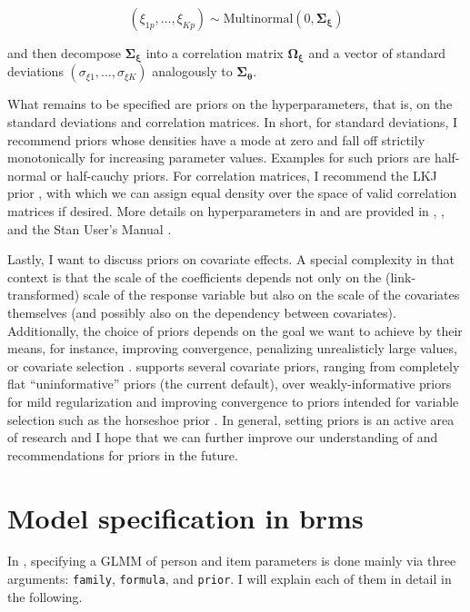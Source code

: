 \documentclass[jss]{jss}
\begin{document}
\[
(\xi_{1p}, \ldots, \xi_{Kp}) \sim \text{Multinormal}(0, \mathbf{\Sigma_\xi})
\]

and then decompose \(\mathbf{\Sigma_\xi}\) into a correlation matrix
\(\mathbf{\Omega_\xi}\) and a vector of standard deviations
\((\sigma_{\xi 1}, \ldots, \sigma_{\xi K})\) analogously to
\(\mathbf{\Sigma_\theta}\).

What remains to be specified are priors on the hyperparameters, that is,
on the standard deviations and correlation matrices. In short, for
standard deviations, I recommend priors whose densities have a mode at
zero and fall off strictily monotonically for increasing parameter
values. Examples for such priors are half-normal or half-cauchy priors.
For correlation matrices, I recommend the LKJ prior
\citep{lewandowski2009}, with which we can assign equal density over the
space of valid correlation matrices if desired. More details on
hyperparameters in  and  are provided in
\citet{brms1}, \citet{brms2}, and the Stan User's Manual
\citep{stanM2019}.

Lastly, I want to discuss priors on covariate effects. A special
complexity in that context is that the scale of the coefficients depends
not only on the (link-transformed) scale of the response variable but
also on the scale of the covariates themselves (and possibly also on the
dependency between covariates). Additionally, the choice of priors
depends on the goal we want to achieve by their means, for instance,
improving convergence, penalizing unrealisticly large values, or
covariate selection \citep[see also][]{gelman2017}.  supports
several covariate priors, ranging from completely flat ``uninformative''
priors (the current default), over weakly-informative priors for mild
regularization and improving convergence to priors intended for variable
selection such as the horseshoe prior
\citep{carvalho2010, piironen2017}. In general, setting priors is an
active area of research and I hope that we can further improve our
understanding of and recommendations for priors in the future.

\hypertarget{brms}{%
\section{Model specification in brms}\label{brms}}

In , specifying a GLMM of person and item parameters is done
mainly via three arguments: \texttt{family}, \texttt{formula}, and
\texttt{prior}. I will explain each of them in detail in the following.
\end{document}
